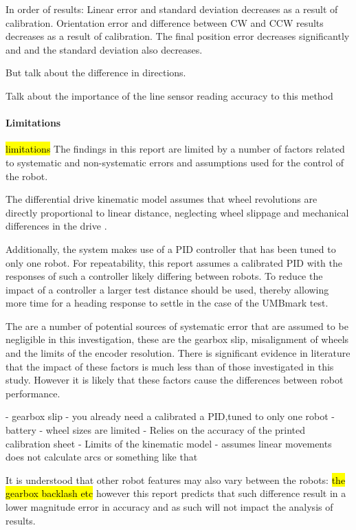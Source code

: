 \documentclass[conference]{IEEEtran}
\begin{document}
In order of results:
Linear error and standard deviation decreases as a result of calibration.
Orientation error and difference between CW and CCW results decreases as a result of calibration.
The final position error decreases significantly and and the standard deviation also decreases.

But talk about the difference in directions.

Talk about the importance of the line sensor reading accuracy to this method




\paragraph{Limitations}

\hl{limitations}
The findings in this report are limited by a number of factors related to systematic and non-systematic errors and assumptions used for the control of the robot.

The differential drive kinematic model assumes that wheel revolutions are directly proportional to linear distance, neglecting wheel slippage and mechanical differences in the drive \cite{odometry}.

Additionally, the system makes use of a PID controller that has been tuned to only one robot. For repeatability, this report assumes a calibrated PID with the responses of such a controller likely differing between robots. 
To reduce the impact of a controller a larger test distance should be used, thereby allowing more time for a heading response to settle in the case of the UMBmark test.

The are a number of potential sources of systematic error that are assumed to be negligible in this investigation, these are the gearbox slip, misalignment of wheels and the limits of the encoder resolution. There is significant evidence in literature that the impact of these factors is much less than of those investigated in this study. However it is likely that these factors cause the differences between robot performance.



- gearbox slip
- you already need a calibrated a PID,tuned to only one robot
- battery
- wheel sizes are limited
- Relies on the accuracy of the printed calibration sheet
- Limits of the kinematic model - assumes linear movements does not calculate arcs or something like that




It is understood that other robot features may also vary between the robots: \hl{the gearbox backlash etc} however this report predicts that such difference result in a lower magnitude error in accuracy and as such will not impact the analysis of results.
\end{document}
